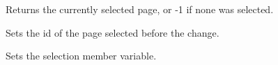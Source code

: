 Returns the currently selected page, or -1 if none was selected.

\label{wxnotebookeventsetoldselection}


Sets the id of the page selected before the change.

\label{wxnotebookeventsetselection}


Sets the selection member variable.




